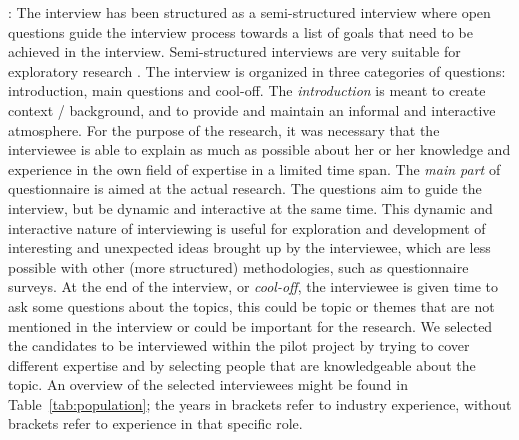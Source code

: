 : The interview has been structured as a semi-structured interview where open questions guide the interview process towards a list of goals that need to be achieved in the interview. Semi-structured interviews are very suitable for exploratory research \cite{Runeson:2009:GCR:1519313.1519324}. The interview is organized in three categories of questions: introduction, main questions and cool-off.
The {\em introduction} is meant to create context / background, and to provide and maintain an informal and interactive atmosphere. For the purpose of the research, it was necessary that the interviewee is able to explain as much as possible about her or her knowledge and experience in the own field of expertise in a limited time span. 
The {\em main part} of questionnaire is aimed at the actual research. The questions aim to guide the interview, but be dynamic and interactive at the same time. This dynamic and interactive nature of interviewing is useful for exploration and development of interesting and unexpected ideas brought up by the interviewee, which are less possible with other (more structured) methodologies, such as questionnaire surveys.
At the end of the interview, or {\em cool-off}, the interviewee is given time to ask some questions about the topics, this could be topic or themes that are not mentioned in the interview or could be important for the research.  We selected the candidates to be interviewed within the pilot project by trying to cover different expertise and by selecting people that are knowledgeable about the topic.
An overview of the selected interviewees might be found in Table~\ref{tab:population}; the years in brackets refer to industry experience, without brackets refer to experience in that specific role.

